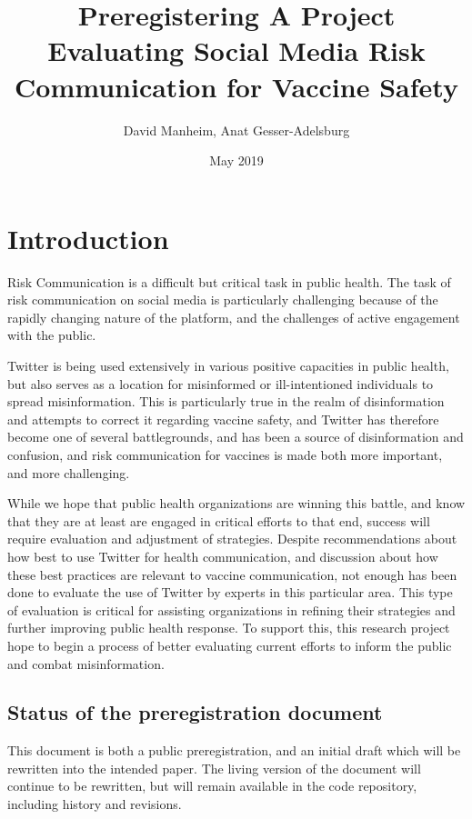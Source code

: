 \documentclass{article}
\title{Preregistering A Project Evaluating Social Media Risk Communication for Vaccine Safety}
\author{David Manheim, Anat Gesser-Adelsburg}
\date{May 2019}
\begin{document}
\maketitle

\section{Introduction}
Risk Communication is a difficult but critical task in public health. The task of risk communication on social media is particularly challenging because of the rapidly changing nature of the platform, and the challenges of active engagement with the public. 

Twitter is being used extensively in various positive capacities in public health\cite{Denecke2013,Paul2011, MORE}, but also serves as a location for misinformed or ill-intentioned individuals to spread misinformation\cite{Aymanns2017, Broniatowski2018, MORE}. This is particularly true in the realm of disinformation and attempts to correct it regarding vaccine safety, and Twitter has therefore become one of several battlegrounds, and has been a source of disinformation and confusion\cite{Broniatowski2018, MORE}, and risk communication for vaccines is made both more important, and more challenging.

While we hope that public health organizations are winning this battle, and know that they are at least are engaged in critical efforts to that end, success will require evaluation and adjustment of strategies. Despite recommendations about how best to use Twitter for health communication, and discussion about how these best practices are relevant to vaccine communication, not enough has been done to evaluate the use of Twitter by experts in this particular area. This type of evaluation is critical for assisting organizations in refining their strategies and further improving public health response. To support this, this research project hope to begin a process of better evaluating current efforts to inform the public and combat misinformation.

\subsection{Status of the preregistration document}
This document is both a public preregistration, and an initial draft which will be rewritten into the intended paper. The living version of the document will continue to be rewritten, but will remain available in the code repository, including history and revisions.
\end{document}
